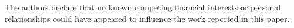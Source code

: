 The authors declare that no known competing financial interests or personal relationships could have appeared to influence the work reported in this paper.
